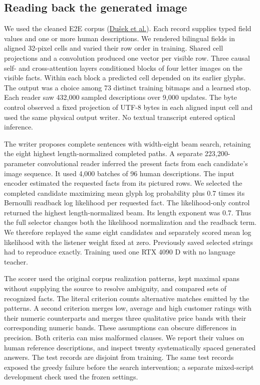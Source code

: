 \subsection*{Reading back the generated image}
We used the cleaned E2E corpus (\href{https://github.com/tuetschek/e2e-cleaning}{Du\v{s}ek et al.}). Each record supplies typed field values and one or more human descriptions. We rendered bilingual fields in aligned 32-pixel cells and varied their row order in training. Shared cell projections and a convolution produced one vector per visible row. Three causal self- and cross-attention layers conditioned blocks of four letter images on the visible facts. Within each block a predicted cell depended on its earlier glyphs. The output was a choice among 73 distinct training bitmaps and a learned stop. Each reader saw 432,000 sampled descriptions over 9,000 updates. The byte control observed a fixed projection of UTF-8 bytes in each aligned input cell and used the same physical output writer. No textual transcript entered optical inference.

The writer proposes complete sentences with width-eight beam search, retaining the eight highest length-normalized completed paths. A separate 223,200-parameter convolutional reader inferred the present facts from each candidate's image sequence. It used 4,000 batches of 96 human descriptions. The input encoder estimated the requested facts from its pictured rows. We selected the completed candidate maximizing mean glyph log probability plus 0.7 times its Bernoulli readback log likelihood per requested fact. The likelihood-only control returned the highest length-normalized beam. Its length exponent was 0.7. Thus the full selector changes both the likelihood normalization and the readback term. We therefore replayed the same eight candidates and separately scored mean log likelihood with the listener weight fixed at zero. Previously saved selected strings had to reproduce exactly. Training used one RTX 4090 D with no language teacher.

The scorer used the original corpus realization patterns, kept maximal spans without supplying the source to resolve ambiguity, and compared sets of recognized facts. The literal criterion counts alternative matches emitted by the patterns. A second criterion merges low, average and high customer ratings with their numeric counterparts and merges three qualitative price bands with their corresponding numeric bands. These assumptions can obscure differences in precision. Both criteria can miss malformed clauses. We report their values on human reference descriptions, and inspect twenty systematically spaced generated answers. The test records are disjoint from training. The same test records exposed the greedy failure before the search intervention; a separate mixed-script development check used the frozen settings.
